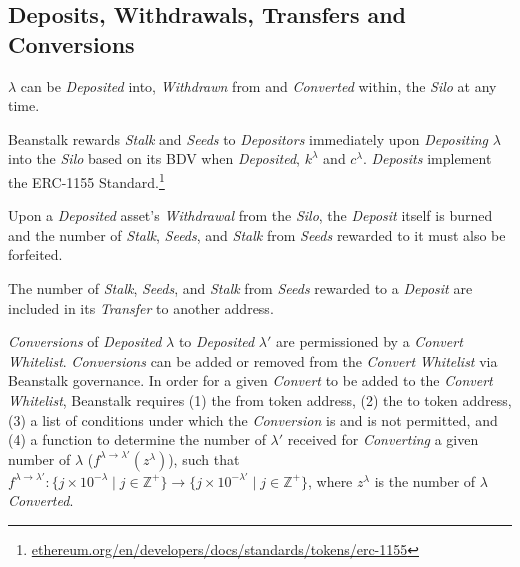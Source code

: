 \documentclass[tikz]{article}
\newcommand{\term}[1]{\textsl{#1}}
\newcommand{\fref}[1]{\footnote{\href{http://#1}{#1}}}
\begin{document}

\vspace*{-1mm}
\subsection{Deposits, Withdrawals, Transfers and Conversions}
\vspace*{-1mm}

\hyperlink{ht126}{$\lambda$} can be \term{Deposited} into, \term{Withdrawn} from and \term{Converted} within, the \term{Silo} at any time.

\vspace*{-1mm}

Beanstalk rewards \term{Stalk} and \term{Seeds} to \term{Depositors} immediately upon \term{Depositing} \hyperlink{ht126}{$\lambda$} into the \term{Silo} based on its BDV when \term{Deposited}, \hyperlink{ht120}{$k^{\lambda}$} and \hyperlink{ht32}{$c^{\lambda}$}. \term{Deposits} implement the ERC-1155 Standard.\fref{ethereum.org/en/developers/docs/standards/tokens/erc-1155}

Upon a \term{Deposited} asset's \term{Withdrawal} from the \term{Silo}, the \term{Deposit} itself is burned and the number of \term{Stalk}, \term{Seeds}, and \term{Stalk} from \term{Seeds} rewarded to it must also be forfeited. 

The number of \term{Stalk}, \term{Seeds}, and \term{Stalk} from \term{Seeds} rewarded to a \term{Deposit} are included in its \term{Transfer} to another address.

\term{Conversions} of \term{Deposited} \hyperlink{ht126}{$\lambda$} to \term{Deposited} $\lambda'$ are permissioned by a \term{Convert} \term{Whitelist}. \term{Conversions} can be added or removed from the \term{Convert} \term{Whitelist} via Beanstalk governance. In order for a given \term{Convert} to be added to the \term{Convert} \term{Whitelist}, Beanstalk requires (1) the from token address, (2) the to token address, (3) a list of conditions under which the \term{Conversion} is and is not permitted, and (4) a function to determine the number of $\lambda'$ received for \term{Converting} a given number of \hyperlink{ht126}{$\lambda$} ($f^{\lambda \rightarrow \lambda'}(z^{\lambda})$), such that $f^{\lambda \rightarrow \lambda'}\colon \{j \times 10^{-\lambda} \mid j \in \mathbb{Z}^{+} \} \rightarrow \{j \times 10^{-\lambda'} \mid j \in \mathbb{Z}^{+} \}$, where $z^{\lambda}$ is the number of \hyperlink{ht126}{\hyperlink{ht126}{$\lambda$}} \term{Converted}. 
\end{document}

